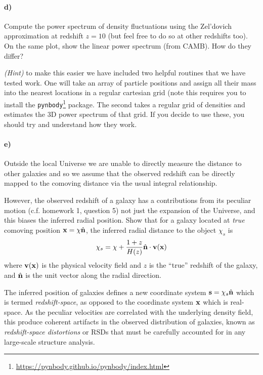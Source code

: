 \documentclass[12pt]{article}
\begin{document}
\paragraph{d)} Compute the power spectrum of density fluctuations using the
Zel'dovich approximation at redshift $z=10$ (but feel free to do so at other
redshifts too). On the same plot, show the linear power spectrum (from CAMB).
How do they differ?

\emph{(Hint)} to make this easier we have included two helpful routines that we have tested work. One will take an array of particle positions and assign all their mass into the nearest locations in a regular cartesian grid (note this requires you to install the \texttt{pynbody}\footnote{\url{https://pynbody.github.io/pynbody/index.html}} package. The second takes a regular grid of densities and estimates the 3D power spectrum of that grid. If you decide to use these, you should try and understand how they work.

\paragraph{e)} Outside the local Universe we are unable to directly measure the distance to other galaxies and so we assume that the observed redshift can be directly mapped to the comoving distance via the usual integral relationship.

However, the observed redshift of a galaxy has a contributions from its peculiar motion (c.f. homework 1, question 5) not just the expansion of the Universe, and this biases the inferred radial position. Show that for a galaxy located at \emph{true} comoving position ${\boldsymbol{\mathbf{x}}} = \chi \hat{{\boldsymbol{\mathbf{n}}}}$, the inferred radial distance to the object $\chi_s$ is
\begin{equation}
    \chi_s = \chi + \frac{1 + z}{H(z)}\hat{{\boldsymbol{\mathbf{n}}}} \cdot {\boldsymbol{\mathbf{v}}}({\boldsymbol{\mathbf{x}}})
\end{equation}
where ${\boldsymbol{\mathbf{v}}}({\boldsymbol{\mathbf{x}}})$ is the physical velocity field and $z$ is the ``true'' redshift of the galaxy, and $\hat{{\boldsymbol{\mathbf{n}}}}$ is the unit vector along the radial direction.

The inferred position of galaxies defines a new coordinate system ${\boldsymbol{\mathbf{s}}} = \chi_s \hat{{\boldsymbol{\mathbf{n}}}}$ which is termed \emph{redshift-space}, as opposed to the coordinate system ${\boldsymbol{\mathbf{x}}}$ which is real-space. As the peculiar velocities are correlated with the underlying density field, this produce coherent artifacts in the observed distribution of galaxies, known as \emph{redshift-space distortions} or RSDs that must be carefully accounted for in any large-scale structure analysis.
\end{document}
